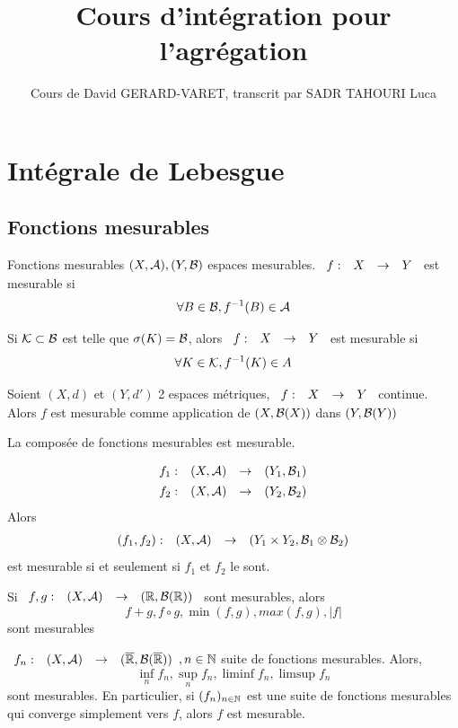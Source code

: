 \documentclass[]{report}
\title{Cours d'intégration pour l'agrégation}
\author{Cours de David GERARD-VARET, transcrit par SADR TAHOURI Luca}
\date{}
\begin{document}
\maketitle
\tableofcontents

\chapter{Intégrale de Lebesgue}

\section{Fonctions mesurables}

\begin{df}{Fonctions mesurables}{}
    $(X,\mathcal{A}),(Y,\mathcal{B})$ espaces mesurables. $\begin{array}{ccccc} f : & X & \to & Y \end{array}$ est mesurable si
    \[\forall B\in \mathcal{B},f^{-1}(B)\in \mathcal{A}\]
\end{df}

\begin{prop}{}{}
    Si $\mathcal{K}\subset \mathcal{B}$ est telle que $\sigma(K)=\mathcal{B}$, alors $\begin{array}{ccccc} f : & X & \to & Y \end{array}$ est mesurable si
    \[\forall K\in \mathcal{K},f^{-1}(K)\in A\]
\end{prop}

\begin{prop}{}{}
    Soient $(X,d)$ et $(Y,d')$ 2 espaces métriques, $\begin{array}{ccccc} f : & X & \to & Y \end{array}$ continue. Alors $f$ est mesurable comme application de $(X,\mathcal{B}(X))$ dans $(Y,\mathcal{B}(Y))$
\end{prop}

\begin{lm}{}{}
    La composée de fonctions mesurables est mesurable.
\end{lm}

\begin{lm}{}{}
    \begin{align*}
        \begin{array}{ccccc} f_1 : & (X,\mathcal{A}) & \to & (Y_1,\mathcal{B}_1) \end{array} \\
        \begin{array}{ccccc} f_2 : & (X,\mathcal{A}) & \to & (Y_2,\mathcal{B}_2) \end{array}
    \end{align*}
    Alors
    \[\begin{array}{ccccc} (f_1,f_2) : & (X,\mathcal{A}) & \to & (Y_1\times Y_2,\mathcal{B}_1\otimes \mathcal{B}_2) \end{array}\]
    est mesurable si et seulement si $f_1$ et $f_2$ le sont.
\end{lm}

\begin{cor}{}{}
    Si $\begin{array}{ccccc} f,g : & (X,\mathcal{A}) & \to & (\mathbb{R},\mathcal{B}(\mathbb{R})) \end{array}$ sont mesurables, alors
    \[f+g,f\circ g, \min (f,g), max (f,g),\left|f\right|\]
    sont mesurables
\end{cor}

\begin{prop}{}{}
    $\begin{array}{ccccc} f_n : & (X,\mathcal{A}) & \to & (\overline{\mathbb{R}},\mathcal{B}(\overline{\mathbb{R}})) \end{array},n\in \mathbb{N}$ suite de fonctions mesurables. Alors,
    \[\inf_n f_n, \sup_n f_n, \liminf f_n, \limsup f_n\]
    sont mesurables. En particulier, si $(f_n)_{n\in\mathbb{N}}$ est une suite de fonctions mesurables qui converge simplement vers $f$, alors $f$ est mesurable.
\end{prop}
\end{document}
